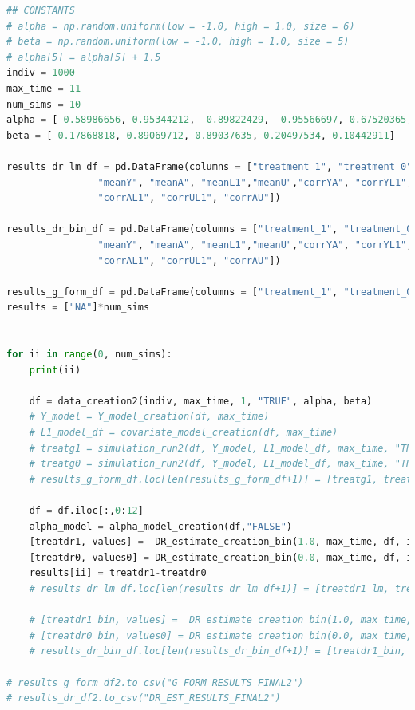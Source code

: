 \begin{lstlisting}[language=Python]
## CONSTANTS 
# alpha = np.random.uniform(low = -1.0, high = 1.0, size = 6)
# beta = np.random.uniform(low = -1.0, high = 1.0, size = 5)
# alpha[5] = alpha[5] + 1.5
indiv = 1000 
max_time = 11
num_sims = 10
alpha = [ 0.58986656, 0.95344212, -0.89822429, -0.95566697, 0.67520365, 2.46365403]
beta = [ 0.17868818, 0.89069712, 0.89037635, 0.20497534, 0.10442911]

results_dr_lm_df = pd.DataFrame(columns = ["treatment_1", "treatment_0", "difference", \
                "meanY", "meanA", "meanL1","meanU","corrYA", "corrYL1", "corrYU", \
                "corrAL1", "corrUL1", "corrAU"])

results_dr_bin_df = pd.DataFrame(columns = ["treatment_1", "treatment_0", "difference", \
                "meanY", "meanA", "meanL1","meanU","corrYA", "corrYL1", "corrYU", \
                "corrAL1", "corrUL1", "corrAU"])

results_g_form_df = pd.DataFrame(columns = ["treatment_1", "treatment_0", "difference"])
results = ["NA"]*num_sims


for ii in range(0, num_sims): 
    print(ii) 
    
    df = data_creation2(indiv, max_time, 1, "TRUE", alpha, beta) 
    # Y_model = Y_model_creation(df, max_time)
    # L1_model_df = covariate_model_creation(df, max_time)
    # treatg1 = simulation_run2(df, Y_model, L1_model_df, max_time, "TRUE", 1)
    # treatg0 = simulation_run2(df, Y_model, L1_model_df, max_time, "TRUE", 0)
    # results_g_form_df.loc[len(results_g_form_df+1)] = [treatg1, treatg0, treatg1-treatg0]

    df = df.iloc[:,0:12]
    alpha_model = alpha_model_creation(df,"FALSE")
    [treatdr1, values] =  DR_estimate_creation_bin(1.0, max_time, df, indiv, "FALSE", "FALSE", alpha_model)
    [treatdr0, values0] = DR_estimate_creation_bin(0.0, max_time, df, indiv, "FALSE", "FALSE", alpha_model)
    results[ii] = treatdr1-treatdr0
    # results_dr_lm_df.loc[len(results_dr_lm_df+1)] = [treatdr1_lm, treatdr0_lm, treatdr1_lm-treatdr0_lm]+list(values)
    
    # [treatdr1_bin, values] =  DR_estimate_creation_bin(1.0, max_time, df, indiv, "FALSE", "FALSE", alpha_model)
    # [treatdr0_bin, values0] = DR_estimate_creation_bin(0.0, max_time, df, indiv, "FALSE", "FALSE", alpha_model)
    # results_dr_bin_df.loc[len(results_dr_bin_df+1)] = [treatdr1_bin, treatdr0_bin, treatdr1_bin-treatdr0_bin]+list(values)

# results_g_form_df2.to_csv("G_FORM_RESULTS_FINAL2")
# results_dr_df2.to_csv("DR_EST_RESULTS_FINAL2")
\end{lstlisting}


